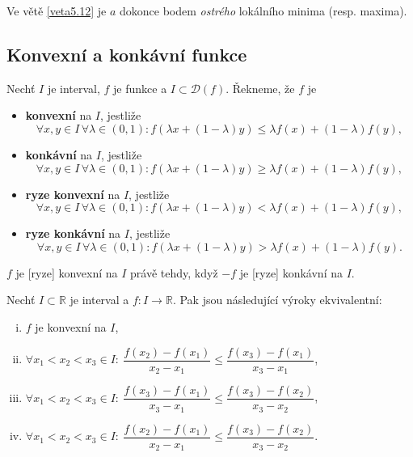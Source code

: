 \begin{poznamka}\label{poznamkaveta5.12}
	Ve větě \ref{veta5.12} je $a$ dokonce bodem \emph{ostrého} lokálního minima (resp. maxima).
\end{poznamka}

\subsection{Konvexní a konkávní funkce}

\begin{definice}
Nechť $I$ je interval, $f$ je funkce a $I\subset \mathcal D(f)$. Řekneme, že $f$ je
\begin{itemize}
	\item \textbf{konvexní} na $I$, jestliže
	$$
	    \forall x, y \in I \, \forall \lambda\in(0,1): f(\lambda x + (1-\lambda)y)\leq \lambda f(x)+ (1-\lambda)f(y),
	$$
	\item \textbf{konkávní} na $I$, jestliže
	$$
	    \forall x, y \in I \, \forall \lambda\in(0,1): f(\lambda x + (1-\lambda)y)\geq \lambda f(x)+ (1-\lambda)f(y),
	$$
	\item \textbf{ryze konvexní} na $I$, jestliže
	$$
	    \forall x, y \in I \, \forall \lambda\in(0,1): f(\lambda x + (1-\lambda)y)< \lambda f(x)+ (1-\lambda)f(y),
	$$
	\item \textbf{ryze konkávní} na $I$, jestliže
	$$
	    \forall x, y \in I \, \forall \lambda\in(0,1): f(\lambda x + (1-\lambda)y)> \lambda f(x)+ (1-\lambda)f(y).
	$$
\end{itemize}
\end{definice}

\begin{poznamka}
$f$ je [ryze] konvexní na $I$ právě tehdy, když $-f$ je [ryze] konkávní na $I$.
\end{poznamka}

\begin{lemma}\label{lemma5.13}
Nechť $I \subset \mathbb{R}$ je interval a $f : I \to \mathbb{R}$. Pak jsou následující výroky ekvivalentní:
\begin{enumerate}[(i)]
\item $f$ je konvexní na $I$,
\item $\forall x_1 < x_2 < x_3 \in I:\ \dfrac{f(x_2)-f(x_1)}{x_2 - x_1} \leq \dfrac{f(x_3)-f(x_1)}{x_3 - x_1}$,
\item $\forall x_1 < x_2 < x_3 \in I:\ \dfrac{f(x_3)-f(x_1)}{x_3 - x_1} \leq \dfrac{f(x_3)-f(x_2)}{x_3 - x_2}$,
\item $\forall x_1 < x_2 < x_3 \in I:\ \dfrac{f(x_2)-f(x_1)}{x_2 - x_1} \leq \dfrac{f(x_3)-f(x_2)}{x_3 - x_2}$.
\end{enumerate}
\end{lemma}

